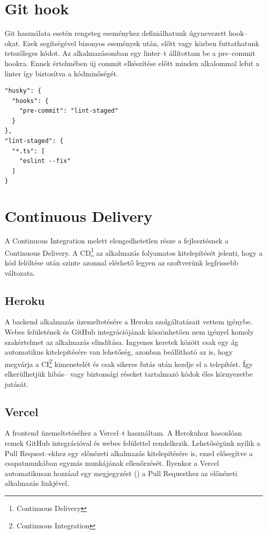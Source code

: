 \section{Git hook}
Git használata esetén rengeteg eseményhez definiálhatunk úgynevezett hook–okat.
Ezek segítségével bizonyos események után, előtt vagy közben futtathatunk tetszőleges kódot.
Az alkalmazásomban egy linter–t állítottam be a pre–commit hookra.
Ennek értelmében új commit elkészítése előtt minden alkalommal lefut a linter így biztosítva a kódminőségét.

\begin{lstlisting}[style=ES6, caption=Pre–commit hook beállításai]    
"husky": {
  "hooks": {
    "pre-commit": "lint-staged"
  }
},
"lint-staged": {
  "*.ts": [
    "eslint --fix"
  ]
}
\end{lstlisting}
  

\section{Continuous Delivery}
A Continuous Integration melett elengedhetetlen része a fejlesztésnek a Continuous Delivery.
A CD\footnote{Continuous Delivery} az alkalmazás folyamatos kitelepítését jelenti, hogy a kód felöltése után szinte azonnal elérhető legyen az szoftverünk legfrissebb változata.


\subsection{Heroku}
A backend alkalmazás üzemeltetésére a Heroku szolgáltatásait vettem igénybe.
Webes felületének és GitHub integrációjának köszönhetően nem igényel komoly szakértelmet az alkalmazás elindítása.
Ingyenes keretek között csak egy ág automatikus kitelepítésére van lehetőség, azonban beállítható az is, hogy megvárja a CI\footnote{Continuous Integration} kimenetelét és csak sikeres futás után kezdje el a telepítést.
Így elkerülhetjük hibás– vagy biztonsági réseket tartalmazó kódok éles környezetbe jutását.


\subsection{Vercel}
A frontend üzemeltetéséhez a Vercel–t használtam. 
A Herokuhoz hasonlóan remek GitHub integrációval és webes felülettel rendelkezik. 
Lehetőségünk nyílik a Pull Request–ekhez egy előnézeti alkalmazás kitelepítésére is, ezzel elősegítve a csapatmunkában egymás munkájának ellenőrzését.
Ilyenkor a Vercel automatikusan hozzáad egy megjegyzést () a Pull Requesthez az előnézeti alkalmazás linkjével.

